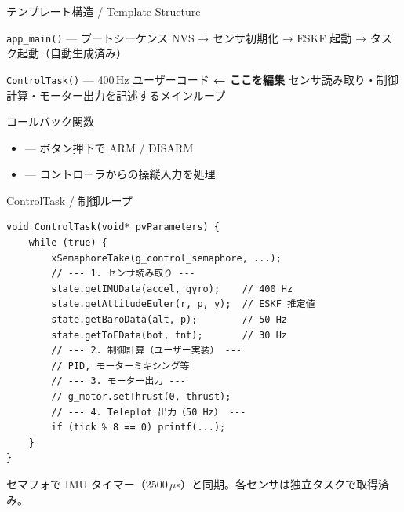 \begin{frame}{テンプレート構造 / Template Structure}

  \begin{block}{\texttt{app\_main()} — ブートシーケンス}
    {\small NVS → センサ初期化 → ESKF 起動 → タスク起動（自動生成済み）}
  \end{block}

  \vspace{0.3em}

  \begin{alertblock}{\texttt{ControlTask()} — 400\,Hz ユーザーコード \textbf{← ここを編集}}
    {\small センサ読み取り・制御計算・モーター出力を記述するメインループ}
  \end{alertblock}

  \vspace{0.3em}

  \begin{exampleblock}{コールバック関数}
    {\small
    \begin{itemize}
      \item {} — ボタン押下で ARM / DISARM
      \item {} — コントローラからの操縦入力を処理
    \end{itemize}
    }
  \end{exampleblock}
\end{frame}

\begin{frame}[fragile]{ControlTask / 制御ループ}
  \begin{lstlisting}[style=sfcpp, basicstyle=\ttfamily\scriptsize]
void ControlTask(void* pvParameters) {
    while (true) {
        xSemaphoreTake(g_control_semaphore, ...);
        // --- 1. センサ読み取り ---
        state.getIMUData(accel, gyro);    // 400 Hz
        state.getAttitudeEuler(r, p, y);  // ESKF 推定値
        state.getBaroData(alt, p);        // 50 Hz
        state.getToFData(bot, fnt);       // 30 Hz
        // --- 2. 制御計算（ユーザー実装） ---
        // PID, モーターミキシング等
        // --- 3. モーター出力 ---
        // g_motor.setThrust(0, thrust);
        // --- 4. Teleplot 出力（50 Hz） ---
        if (tick % 8 == 0) printf(...);
    }
}
  \end{lstlisting}

  {\footnotesize
    セマフォで IMU タイマー（2500\,$\mu$s）と同期。各センサは独立タスクで取得済み。
  }
\end{frame}


